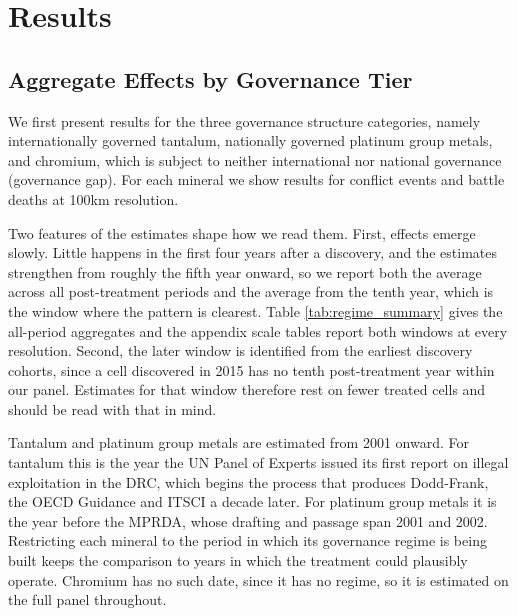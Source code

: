 \documentclass[11pt]{article}
\begin{document}
\section{Results}
\label{sec:results}

\subsection{Aggregate Effects by Governance Tier}

We first present results for the three governance structure categories, namely internationally governed tantalum, nationally governed platinum group metals, and chromium, which is subject to neither international nor national governance (governance
gap). For each mineral we show results for conflict events and battle deaths at 100km resolution.

Two features of the estimates shape how we read them. First, effects emerge slowly. Little happens in the first four years after a discovery, and the estimates strengthen from roughly the fifth year onward, so we report both the average across all post-treatment periods and the average from the tenth year, which is the window where the pattern is clearest. Table \ref{tab:regime_summary} gives the all-period aggregates and the appendix scale tables report both windows at every resolution. Second, the later window is identified from the earliest discovery cohorts, since a cell discovered in 2015 has no tenth post-treatment year within our panel. Estimates for that window therefore rest on fewer treated cells and should be read with that in mind.

Tantalum and platinum group metals are estimated from 2001 onward. For tantalum this is the year the UN Panel of Experts issued its first report on illegal exploitation in the DRC, which begins the process that produces Dodd-Frank, the OECD Guidance and ITSCI a decade later. For platinum group metals it is the year before the MPRDA, whose drafting and passage span 2001 and 2002. Restricting each mineral to the period in which its governance regime is being built keeps the comparison to years in which the treatment could plausibly operate. Chromium has no such date, since it has no regime, so it is estimated on the full panel throughout.
\end{document}
